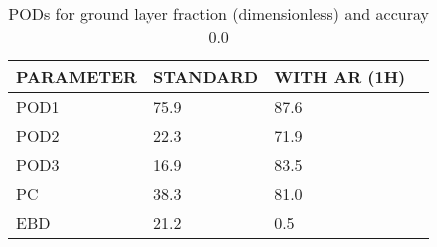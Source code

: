 \begin{table}[]
\begin{center}
\begin{tabular}{|l|l|l|l|}
\hline
\multicolumn{1}{|c|}{\cellcolor[HTML]{C0C0C0}\textbf{PARAMETER}} & \multicolumn{1}{c|}{\cellcolor[HTML]{C0C0C0}\textbf{STANDARD}} & \multicolumn{1}{c|}{\cellcolor[HTML]{C0C0C0}\textbf{WITH AR (1H)}} \\
\hline
\cellcolor[HTML]{C0C0C0}POD1  & 75.9                                & 87.6         \\
\cellcolor[HTML]{C0C0C0}POD2  & 22.3                                & 71.9         \\
\cellcolor[HTML]{C0C0C0}POD3  & 16.9                                & 83.5         \\
\cellcolor[HTML]{C0C0C0}PC    & 38.3                                  & 81.0           \\
\cellcolor[HTML]{C0C0C0}EBD   & 21.2                                 & 0.5          \\
\hline
\end{tabular}
\caption{PODs for ground layer fraction (dimensionless) and accuray 0.0}
\end{center}
\end{table}
